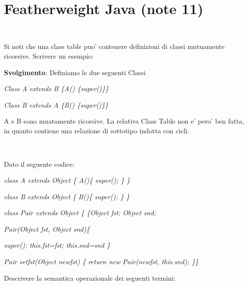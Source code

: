 \section{Featherweight Java (note 11)} 
\subsection*{}\
\\ 
Si noti che una class table puo' contenere definizioni di classi mutuamente ricorsive.
\linebreak Scrivere un esempio:


\vspace{0,5cm}
\noindent
\textbf{Svolgimento}:\linebreak
Definiamo le due seguenti Classi

\vspace{0,3cm}
\textit{Class A extends B \{A() \{super()\}\}}

\vspace{0,3cm}
\textit{Class B extends A \{B() \{super()\}\}}

\vspace{0,5cm}

\noindent
A e B sono muatamente ricorsive. La relativa Class Table non e' pero' ben fatta, in quanto contiene una relazione di sottotipo indotta con cicli.

\vspace{1cm}
\subsection*{}\
\\ 
Dato il seguente codice:

\vspace{0,3cm}
\textit{class A extends Object \{ A()\{ super(); \} \}}

\textit{class B extends Object \{ B()\{ super(); \} \}}

\textit{class Pair extends Object \{ \{Object fst; Object snd;}

\hspace{0,3cm}\textit{Pair(Object fst, Object snd)\{} 

\hspace{0,6cm} \textit{super(); this.fst=fst; this.snd=snd \} }

\textit{Pair setfst(Object newfst) \{ return new Pair(newfst, this.snd); \}\}}

\vspace{0,5cm}
Descrivere la semantica operazionale dei seguenti termini:

